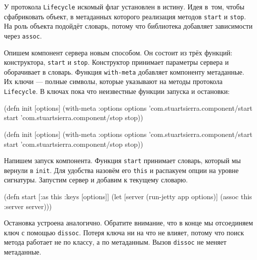 У протокола \verb|Lifecycle| искомый флаг установлен в истину. Идея в~том, чтобы
сфабриковать объект, в метаданных которого реализация методов \verb|start| и
\verb|stop|. На роль объекта подойдёт словарь, потому что библиотека добавляет
зависимости через \verb|assoc|.

Опишем компонент сервера новым способом. Он состоит из трёх функций:
конструктора, \verb|start| и \verb|stop|. Конструктор принимает параметры
сервера и оборачивает в словарь. Функция \verb|with-meta| добавляет компоненту
метаданные. Их ключи — полные символы, которые указывают на методы протокола
\verb|Lifecycle|. В ключах пока что неизвестные функции запуска и остановки:

\ifnarrow

\begin{english}
  \begin{clojure}
(defn init [options]
  (with-meta {:options options}
    {'com.stuartsierra.component/start
     start
     'com.stuartsierra.component/stop
     stop}))
  \end{clojure}
\end{english}

\else

\begin{english}
  \begin{clojure}
(defn init [options]
  (with-meta {:options options}
    {'com.stuartsierra.component/start start
     'com.stuartsierra.component/stop stop}))
  \end{clojure}
\end{english}

\fi

Напишем запуск компонента. Функция \verb|start| принимает словарь, который мы
вернули в \verb|init|. Для удобства назовём его \verb|this| и распакуем опции на
уровне сигнатуры. Запустим сервер и добавим к текущему словарю.

\begin{english}
  \begin{clojure}
(defn start
  [{:as this :keys [options]}]
  (let [server (run-jetty app options)]
    (assoc this :server server)))
  \end{clojure}
\end{english}

Остановка устроена аналогично. Обратите внимание, что в конце мы отсоединяем
ключ с помощью \verb|dissoc|. Потеря ключа ни на что не влияет, потому что поиск
метода работает не по классу, а по метаданным. Вызов \verb|dissoc| не меняет
метаданные.

